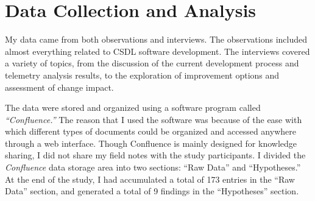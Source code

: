  






\section{Data Collection and Analysis} \label{EvaluationInCSDL:DataCollectionAnalysis}

My data came from both observations and interviews. The observations included almost everything related to CSDL software development. The interviews covered a variety of topics, from the discussion of the current development process and telemetry analysis results, to the exploration of improvement options and assessment of change impact.

The data were stored and organized using a software program called \textit{``Confluence.''} The reason that I used the software was because of the ease with which different types of documents could be organized and accessed anywhere through a web interface. Though Confluence is mainly designed for knowledge sharing, I did not share my field notes with the study participants. I divided the \textit{Confluence} data storage area into two sections: ``Raw Data'' and ``Hypotheses.'' At the end of the study, I had accumulated a total of 173 entries in the ``Raw Data'' section, and generated a total of 9 findings in the ``Hypotheses'' section.

